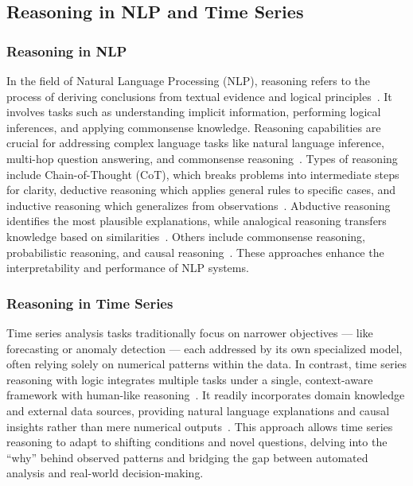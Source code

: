 \begin{table*}[t]
{\begin{tabular}{p{3.5cm}p{5.5cm}p{4.5cm}p{6cm}}
            \bottomrule
        \end{tabular}
    }
    \label{tab:reasoning_types}
\end{table*}


\subsection{Reasoning in NLP and Time Series}

\subsubsection{Reasoning in NLP}
In the field of Natural Language Processing (NLP), reasoning refers to the process of deriving conclusions from textual evidence and logical principles~\cite{besta2025reasoning}. It involves tasks such as understanding implicit information, performing logical inferences, and applying commonsense knowledge. Reasoning capabilities are crucial for addressing complex language tasks like natural language inference, multi-hop question answering, and commonsense reasoning~\cite{yu2024natural}. Types of reasoning include Chain-of-Thought (CoT), which breaks problems into intermediate steps for clarity, deductive reasoning which applies general rules to specific cases, and inductive reasoning which generalizes from observations~\cite{xia2024beyond}. Abductive reasoning identifies the most plausible explanations, while analogical reasoning transfers knowledge based on similarities~\cite{shi2024language,lewis2024using}. Others include commonsense reasoning, probabilistic reasoning, and causal reasoning~\cite{yu2024natural}. These approaches enhance the interpretability and performance of NLP systems. 

\subsubsection{Reasoning in Time Series}
Time series analysis tasks traditionally focus on narrower objectives — like forecasting or anomaly detection — each addressed by its own specialized model, often relying solely on numerical patterns within the data. In contrast, time series reasoning with logic integrates multiple tasks under a single, context-aware framework with human-like reasoning~\cite{chow2024towards}. It readily incorporates domain knowledge and external data sources, providing natural language explanations and causal insights rather than mere numerical outputs~\cite{potosnak2024implicit}. This approach allows time series reasoning to adapt to shifting conditions and novel questions, delving into the “why” behind observed patterns and bridging the gap between automated analysis and real-world decision-making.

